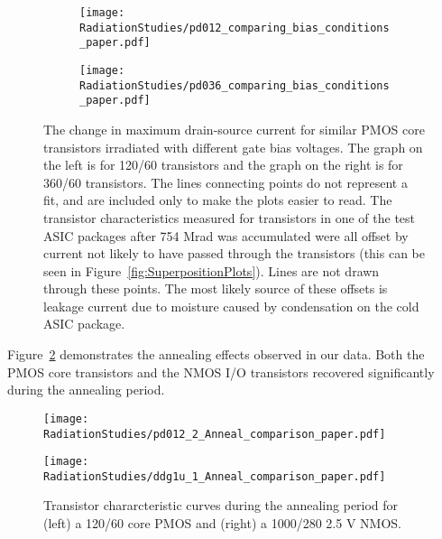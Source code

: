 \begin{figure}[h!]
	\begin{subfigure}{.5\linewidth}
	\centering
	\texttt{[image: RadiationStudies/pd012\_comparing\_bias\_conditions\_paper.pdf]}
	\end{subfigure}
\hspace{0.5cm}
	\begin{subfigure}{.5\linewidth}
	\centering
	\texttt{[image: RadiationStudies/pd036\_comparing\_bias\_conditions\_paper.pdf]}
	\end{subfigure}
\caption{The change in maximum drain-source current for similar PMOS core transistors irradiated with different gate bias voltages. The graph on the left is for 120/60 transistors and the graph on the right is for 360/60 transistors.  The lines connecting points do not represent a fit, and are included only to make the plots easier to read.  The transistor characteristics measured for transistors in one of the test ASIC packages after 754 Mrad was accumulated were all offset by current not likely to have passed through the transistors (this can be seen in Figure~\ref{fig:SuperpositionPlots}).  Lines are not drawn through these points.  The most likely source of these offsets is leakage current due to moisture caused by condensation on the cold ASIC package.}
\label{fig:PMOSBiasConditions}
\end{figure}

Figure~\ref{fig:AnnealSuperpositionPlots} demonstrates the annealing effects observed in our data. Both the PMOS core transistors and the NMOS I/O transistors recovered significantly during the annealing period. 

\begin{figure}[h!]
\begin{minipage}[b]{0.5\textwidth}
	\centering
	\texttt{[image: RadiationStudies/pd012\_2\_Anneal\_comparison\_paper.pdf]}
\end{minipage}
\hspace{0.5cm}
\begin{minipage}[b]{0.5\textwidth}
	\centering
	\texttt{[image: RadiationStudies/ddg1u\_1\_Anneal\_comparison\_paper.pdf]}
\end{minipage}
\caption{Transistor chararcteristic curves during the annealing period for (left) a 120/60 core PMOS and (right) a 1000/280 2.5 V NMOS.}
\label{fig:AnnealSuperpositionPlots}
\end{figure}

